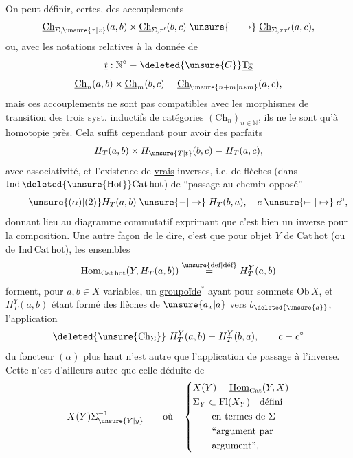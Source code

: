 On peut définir, certes, des accouplements
\[
\underline{\mathrm{Ch}}_{\Sigma,\unsure{\tau|z}}(a,b)\times
\underline{\mathrm{Ch}}_{\Sigma,\tau'}(b,c)\mathrel{\unsure{-|\to}}
\underline{\mathrm{Ch}}_{\Sigma,\tau\tau'}(a,c),
\]
 ou, avec les notations relatives à la donnée de
\[
\underline{t}:\mathbb N^\circ\mathrel{-}\deleted{\unsure{C}}\underline{\mathrm{Tg}}
\]
\[
\underline{\mathrm{Ch}}_n(a,b)\times\underline{\mathrm{Ch}}_m(b,c)\mathrel{-}
\underline{\mathrm{Ch}}_{\unsure{n+m|n*m}}(a,c),
\]
mais ces accouplements \uline{ne sont pas} compatibles avec les morphismes de transition des trois syst. inductifs de catégories $(\mathrm{Ch}_n)_{n\in\mathbb N}$, ils ne le sont \uline{qu'à homotopie près}. Cela suffit cependant pour avoir des  parfaits
\[
H_T(a,b)\times H_{\unsure{T|t}}(b,c)\mathrel{-}H_T(a,c),
\]
avec associativité, et  l'existence de \uline{vrais} inverses, i.e. de  flèches (dans $\mathrm{Ind}\,\deleted{\unsure{\mathrm{Hot}}}\mathrm{Cat\,hot}$) de ``passage au chemin opposé''
\[
\tag*{$\unsure{(\alpha)|(2)}$}
H_T(a,b)\mathrel{\unsure{-|\to}}H_T(b,a),\quad c\mathrel{\unsure{\mapstochar\relbar|\mapsto}}c^\circ,
\]
donnant lieu au diagramme commutatif exprimant que c'est bien un inverse pour la composition. Une autre façon de le dire, c'est que pour  objet $Y$ de $\mathrm{Cat\,hot}$ (ou de $\mathrm{Ind\,Cat\,hot}$),  les ensembles
\[
\mathrm{Hom}_{\mathrm{Cat\,hot}}(Y,H_T(a,b))\overset{\text{\unsure{def|déf}}}{=}H_T^Y(a,b)
\]
forment, pour $a,b\in X$ variables, un \uline{groupoïde}$^{*}$  ayant pour  sommets $\mathrm{Ob}\,X$, et $H_T^Y(a,b)$ étant formé des flèches de $\unsure{a_x|a}$ vers $b_{\deleted{\unsure{a}}}$,   l'application
\[
\deleted{\unsure{\mathrm{Ch}_{\Sigma}}}\ H_T^Y(a,b)\mathrel{-}H_T^Y(b,a),\qquad c\mathrel{\mapstochar\relbar}c^\circ
\]
  du foncteur $(\alpha)$ plus haut n'est autre que l'application de passage à l'inverse. Cette   n'est d'ailleurs autre que celle déduite de
\[
X(Y)\Sigma_{\unsure{Y|y}}^{-1}\qquad\text{où}\quad
\left\{\begin{aligned}
&X(Y)=\underline{\mathrm{Hom}}_{\mathrm{Cat}}(Y,X)\\
&\Sigma_Y\subset\mathrm{Fl}(X_Y)\quad\text{défini}\\
&\qquad\text{en termes de }\Sigma\\
&\qquad\text{``argument par}\\
&\qquad\text{argument'',}
\end{aligned}\right.
\]
